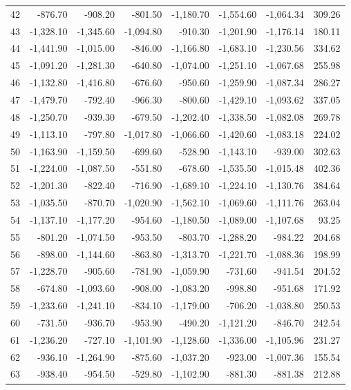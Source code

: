 \begin{longtable}{rrrrrrrr}
42 & -876.70 & -908.20 & -801.50 & -1,180.70 & -1,554.60 & -1,064.34 & 309.26  \\
43 & -1,328.10 & -1,345.60 & -1,094.80 & -910.30 & -1,201.90 & -1,176.14 & 180.11  \\
44 & -1,441.90 & -1,015.00 & -846.00 & -1,166.80 & -1,683.10 & -1,230.56 & 334.62  \\
45 & -1,091.20 & -1,281.30 & -640.80 & -1,074.00 & -1,251.10 & -1,067.68 & 255.98  \\
46 & -1,132.80 & -1,416.80 & -676.60 & -950.60 & -1,259.90 & -1,087.34 & 286.27  \\
47 & -1,479.70 & -792.40 & -966.30 & -800.60 & -1,429.10 & -1,093.62 & 337.05  \\
48 & -1,250.70 & -939.30 & -679.50 & -1,202.40 & -1,338.50 & -1,082.08 & 269.78  \\
49 & -1,113.10 & -797.80 & -1,017.80 & -1,066.60 & -1,420.60 & -1,083.18 & 224.02  \\
50 & -1,163.90 & -1,159.50 & -699.60 & -528.90 & -1,143.10 & -939.00 & 302.63  \\
51 & -1,224.00 & -1,087.50 & -551.80 & -678.60 & -1,535.50 & -1,015.48 & 402.36  \\
52 & -1,201.30 & -822.40 & -716.90 & -1,689.10 & -1,224.10 & -1,130.76 & 384.64  \\
53 & -1,035.50 & -870.70 & -1,020.90 & -1,562.10 & -1,069.60 & -1,111.76 & 263.04  \\
54 & -1,137.10 & -1,177.20 & -954.60 & -1,180.50 & -1,089.00 & -1,107.68 & 93.25  \\
55 & -801.20 & -1,074.50 & -953.50 & -803.70 & -1,288.20 & -984.22 & 204.68  \\
56 & -898.00 & -1,144.60 & -863.80 & -1,313.70 & -1,221.70 & -1,088.36 & 198.99  \\
57 & -1,228.70 & -905.60 & -781.90 & -1,059.90 & -731.60 & -941.54 & 204.52  \\
58 & -674.80 & -1,093.60 & -908.00 & -1,083.20 & -998.80 & -951.68 & 171.92  \\
59 & -1,233.60 & -1,241.10 & -834.10 & -1,179.00 & -706.20 & -1,038.80 & 250.53  \\
60 & -731.50 & -936.70 & -953.90 & -490.20 & -1,121.20 & -846.70 & 242.54  \\
61 & -1,236.20 & -727.10 & -1,101.90 & -1,128.60 & -1,336.00 & -1,105.96 & 231.27  \\
62 & -936.10 & -1,264.90 & -875.60 & -1,037.20 & -923.00 & -1,007.36 & 155.54  \\
63 & -938.40 & -954.50 & -529.80 & -1,102.90 & -881.30 & -881.38 & 212.88  \\

\end{longtable}
